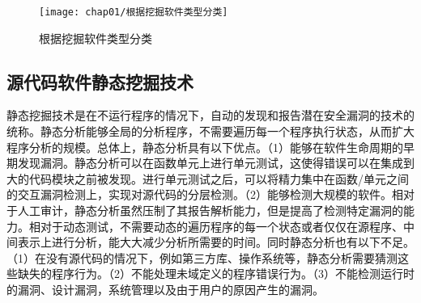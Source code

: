 \begin{figure}[htb]
\begin{center}
\texttt{[image: chap01/根据挖掘软件类型分类]}
\end{center}
\caption{根据挖掘软件类型分类}
\label{根据挖掘软件类型分类}
\end{figure}
\subsection{源代码软件静态挖掘技术}

静态挖掘技术是在不运行程序的情况下，自动的发现和报告潜在安全漏洞的技术的统称。静态分析能够全局的分析程序，不需要遍历每一个程序执行状态，从而扩大程序分析的规模。总体上，静态分析具有以下优点。（1）能够在软件生命周期的早期发现漏洞。静态分析可以在函数单元上进行单元测试，这使得错误可以在集成到大的代码模块之前被发现。进行单元测试之后，可以将精力集中在函数/单元之间的交互漏洞检测上，实现对源代码的分层检测。（2）能够检测大规模的软件。相对于人工审计，静态分析虽然压制了其报告解析能力，但是提高了检测特定漏洞的能力。相对于动态测试，不需要动态的遍历程序的每一个状态或者仅仅在源程序、中间表示上进行分析，能大大减少分析所需要的时间。同时静态分析也有以下不足。（1）在没有源代码的情况下，例如第三方库、操作系统等，静态分析需要猜测这些缺失的程序行为。（2）不能处理未域定义的程序错误行为。（3）不能检测运行时的漏洞、设计漏洞，系统管理以及由于用户的原因产生的漏洞。

%
%


